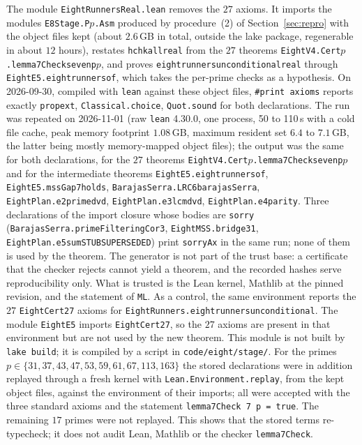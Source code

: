 \documentclass[11pt]{amsart}
\theoremstyle{plain}
\theoremstyle{definition}
\theoremstyle{remark}
\newcommand{\lean}[1]{{\def\_{\textunderscore\allowbreak}\def\.{.\allowbreak}\texttt{#1}}}
\begin{document}
The module \lean{EightRunnersReal.lean} removes the $27$ axioms. It imports the modules
\lean{E8Stage.P}$p$\lean{.Asm} produced by procedure~(2) of Section~\ref{sec:repro} with the object
files kept (about $2.6$\,GB in total, outside the lake package, regenerable in about $12$ hours),
restates \lean{hchk\_all\_real} from the $27$ theorems \lean{EightV4.Cert}$p$\lean{.lemma7Check\_seven\_p}$p$, and
proves \lean{eight\_runners\_unconditional\_real} through \lean{EightE5.eight\_runners\_of}, which takes the
per-prime checks as a hypothesis. On 2026-09-30, compiled with \lean{lean} against these object files,
\lean{\#print axioms} reports exactly \lean{propext}, \lean{Classical.choice}, \lean{Quot.sound} for both
declarations. The run was repeated on 2026-11-01 (raw \lean{lean} 4.30.0, one process, 50 to 110\,s with a
cold file cache, peak memory footprint $1.08$\,GB, maximum resident set $6.4$ to $7.1$\,GB, the latter being mostly
memory-mapped object files); the output was the same for both declarations, for the $27$ theorems
\lean{EightV4.Cert}$p$\lean{.lemma7Check\_seven\_p}$p$ and for the intermediate theorems
\lean{EightE5.eight\_runners\_of}, \lean{EightE5.mssGap7\_holds}, \lean{BarajasSerra.LRC6\_barajasSerra},
\lean{EightPlan.e2\_prime\_dvd}, \lean{EightPlan.e3\_lcm\_dvd}, \lean{EightPlan.e4\_parity}. Three
declarations of the import closure whose bodies are \lean{sorry} (\lean{BarajasSerra.primeFilteringCor3},
\lean{EightMSS.bridge31}, \lean{EightPlan.e5\_sum\_STUB\_SUPERSEDED}) print \lean{sorryAx} in the same run;
none of them is used by the theorem. The generator is not part of the trust base: a certificate
that the checker rejects cannot yield a theorem, and the recorded hashes serve reproducibility only.
What is trusted is the Lean kernel, Mathlib at the pinned revision, and the statement of
\lean{ML}. As a control, the same environment reports the $27$ \lean{EightCert27} axioms for
\lean{EightRunners.eight\_runners\_unconditional}. The module \lean{EightE5} imports \lean{EightCert27}, so
the $27$ axioms are present in that environment but are not used by the new theorem. This module is not
built by \lean{lake build}; it is compiled by a script in \texttt{code/eight/stage/}.
For the primes $p\in\{31,37,43,47,53,59,61,67,113,163\}$ the stored declarations were in addition
replayed through a fresh kernel with \lean{Lean.Environment.replay}, from the kept object files, against the
environment of their imports; all were accepted with the three standard axioms and the statement
\lean{lemma7Check 7 p = true}. The remaining $17$ primes were not replayed. This shows that the stored terms
re-typecheck; it does not audit Lean, Mathlib or the checker \lean{lemma7Check}.
\end{document}
